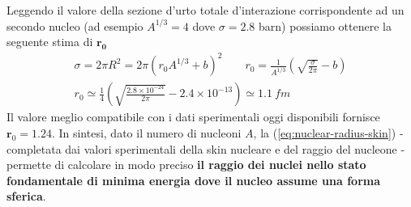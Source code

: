 Leggendo il valore della sezione d'urto totale d'interazione corrispondente ad un secondo nucleo (ad esempio $A^{1/3}=4$ dove $\sigma = 2.8$ barn)
possiamo ottenere la seguente stima di $\bm{r_0}$
\begin{gather*}
	\sigma = 2 \pi R^2 = 2 \pi (r_0 A^{1/3} +b)^2  \qquad r_0 = \frac{1}{A^{1/3}} \left( \sqrt{\frac{\sigma}{2 \pi}}-b \right)\\
	r_0 \simeq \frac{1}{4} \left( \sqrt{\frac{2.8 \times 10^{-24}}{2 \pi} } - 2.4 \times 10^{-13} \right) \simeq1.1 \ fm
\end{gather*}
Il valore meglio compatibile con i dati sperimentali oggi disponibili fornisce $ \bm{r}_0 = 1.24$.
In sintesi, dato il numero di nucleoni $ A$, la (\ref{eq:nuclear-radius-skin}) - completata dai valori sperimentali della
skin nucleare e del raggio del nucleone - permette di calcolare in modo preciso \textbf{il raggio dei nuclei nello stato
fondamentale di minima energia dove il nucleo assume una forma sferica}.

